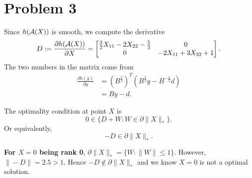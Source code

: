 \section{Problem 3}

Since $h(\mathcal{A}(X))$ is smooth,
we compute the derivative
\begin{equation}
    D:=\frac{\partial h(\mathcal{A}(X))}{\partial X} =
    \begin{bmatrix}
        \frac{3}{2}X_{11}-2X_{22}-\frac{5}{2} & 0 \\
        0   & -2X_{11}+3X_{22}+1 \\
    \end{bmatrix}.
\end{equation}
The two numbers in the matrix come from
\begin{equation}
\begin{split}
    \frac{\partial h(y)}{\partial y}
        &= (B^{\frac{1}{2}})^T(B^{\frac{1}{2}}y-B^{-\frac{1}{2}}d) \\
        &= By-d.
\end{split}
\end{equation}

The optimality condition at point $X$ is
\begin{equation}
    0\in\{D+W:W\in\partial\|X\|_*\}.
\end{equation}
Or equivalently,
\begin{equation}\label{eq:cond}
    -D\in\partial\|X\|_*.
\end{equation}

\textbf{For $X=0$ being rank 0},
$\partial\|X\|_*=\{W:\|W\|\le1\}$.
However,
$\|-D\|=2.5>1$.
Hence $-D\notin\partial\|X\|_*$ and
we know $X=0$ is not a optimal solution.

